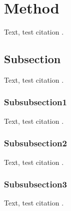\section{Method}
Text, test citation \cite{web:website}.

\subsection{Subsection}
Text, test citation \cite{article:article}.
\subsubsection{Subsubsection1}
Text, test citation \cite{unpublished:unpublished}.
\subsubsection{Subsubsection2}
Text, test citation \cite{book:book}.
\subsubsection{Subsubsection3}
Text, test citation \cite{book:book}.
